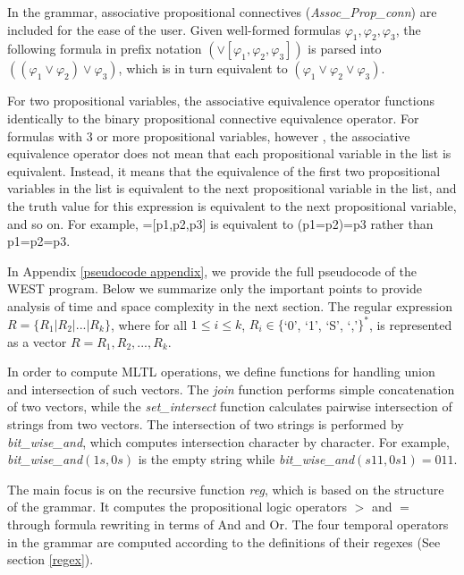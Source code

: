 \documentclass[runningheads]{llncs}
\renewcommand{\phi}{\varphi}
\begin{document}
In the grammar, associative propositional connectives (\textit{Assoc\_Prop\_conn}) are included for the ease of the user. Given well-formed formulas $\phi_1, \phi_2, \phi_3$, the following formula in prefix notation $(\lor[\phi_1, \phi_2, \phi_3])$ is parsed into $((\phi_1 \lor \phi_2) \lor \phi_3)$, which is in turn equivalent to $(\phi_1 \lor \phi_2 \lor \phi_3)$. \\
\begin{remark}
For two propositional variables, the associative equivalence operator functions identically to the binary propositional connective equivalence operator. For formulas with 3 or more propositional variables, however , the associative equivalence operator does not mean that each propositional variable in the list is equivalent. Instead, it means that the equivalence of the first two propositional variables in the list is equivalent to the next propositional variable in the list, and the truth value for this expression is equivalent to the next propositional variable, and so on. For example, =[p1,p2,p3] is equivalent to (p1=p2)=p3 rather than p1=p2=p3.
\end{remark}

In Appendix \ref{pseudocode appendix}, we provide the full pseudocode of the WEST program. Below we summarize only the important points to provide analysis of time and space complexity in the next section. The regular expression $R = \{R_1 | R_2 | ... | R_k\}$, where for all $1 \leq i \leq k$, $R_i \in \{$`0', `1', `S', `,'$\}^*$, is represented as a vector $R = {R_1, R_2, ..., R_k}$.

In order to compute MLTL operations, we define functions for handling union and intersection of such vectors. 
The \textit{join} function performs simple concatenation of two vectors, while the \textit{set\_intersect} function calculates pairwise intersection of strings from two vectors.
The intersection of two strings is performed by \textit{bit\_wise\_and}, which computes intersection character by character.
For example, \textit{bit\_wise\_and}$(1s, 0s)$ is the empty string while \textit{bit\_wise\_and}$(s11, 0s1) = 011$. 

The main focus is on the recursive function \textit{reg}, which is based on the structure of the grammar. It computes the propositional logic operators $>$ and  $=$ through formula rewriting in terms of And and Or. The four temporal operators in the grammar are computed according to the definitions of their regexes (See section \ref{regex}).
\end{document}
